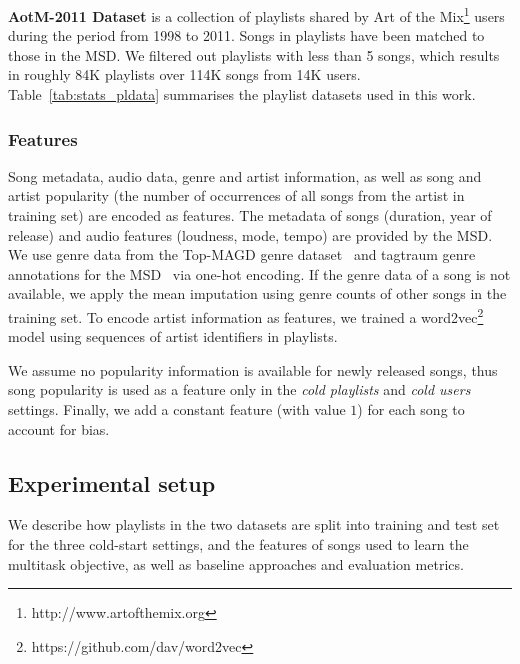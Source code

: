\noindent
{\bf AotM-2011 Dataset} is a collection of playlists shared by Art of the Mix\footnote{http://www.artofthemix.org} 
users during the period from 1998 to 2011. Songs in playlists have been matched to those in the MSD.
We filtered out playlists with less than 5 songs, which results in roughly 84K playlists over 114K songs from 14K users.
%
Table~\ref{tab:stats_pldata} summarises the %
playlist datasets used in this work.


\subsubsection{Features}
Song metadata, audio data, genre and artist information, as well as song and 
artist popularity (\ie the number of occurrences of all songs from the artist in training set)
are encoded as features.
%
The metadata of songs (\eg duration, year of release) and audio features (\eg loudness, mode, tempo) are provided by the MSD.
We use genre data from the Top-MAGD genre dataset~\cite{schindler2012facilitating}
and tagtraum genre annotations for the MSD~\cite{schreiber2015improving} via one-hot encoding.
If the genre data of a song is not available, we apply the mean imputation using genre counts of other songs in the training set.
To encode artist information as features,
we trained a word2vec\footnote{https://github.com/dav/word2vec} model using sequences of artist identifiers in playlists.

We assume no popularity information is available for newly released songs,
thus song popularity is used as a feature only in the \emph{cold playlists} and \emph{cold users} settings.
Finally, we add a constant feature (with value $1$) for each song to account for bias.




\subsection{Experimental setup}

We describe how playlists in the two datasets are split into training and test set for the three cold-start settings,
and the features of songs used to learn the multitask objective, as well as baseline approaches and evaluation metrics.

